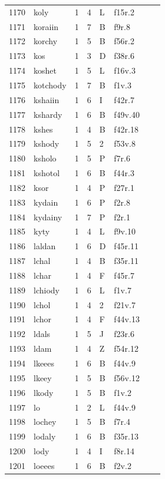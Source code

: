 \documentclass[11pt,a4paper]{article}
\begin{document}
\begin{landscape}
\begin{longtable}{@{}r>{\ttfamily}lrrl>{\ttfamily}l>{\raggedright\arraybackslash}p{80mm}>{\raggedright\arraybackslash}p{36mm}@{}}
1170 & koly & 1 & 4 & L & f15r.2 &  & \\
1171 & koraiin & 1 & 7 & B & f9r.8 &  & \\
1172 & korchy & 1 & 5 & B & f56r.2 &  & \\
1173 & kos & 1 & 3 & D & f38r.6 &  & \\
1174 & koshet & 1 & 5 & L & f16v.3 &  & \\
1175 & kotchody & 1 & 7 & B & f1v.3 &  & \\
1176 & kshaiin & 1 & 6 & I & f42r.7 &  & \\
1177 & kshardy & 1 & 6 & B & f49v.40 &  & \\
1178 & kshes & 1 & 4 & B & f42r.18 &  & \\
1179 & kshody & 1 & 5 & 2 & f53v.8 &  & \\
1180 & ksholo & 1 & 5 & P & f7r.6 &  & \\
1181 & kshotol & 1 & 6 & B & f44r.3 &  & \\
1182 & ksor & 1 & 4 & P & f27r.1 &  & \\
1183 & kydain & 1 & 6 & P & f2r.8 &  & \\
1184 & kydainy & 1 & 7 & P & f2r.1 &  & \\
1185 & kyty & 1 & 4 & L & f9v.10 &  & \\
1186 & laldan & 1 & 6 & D & f45r.11 &  & \\
1187 & lchal & 1 & 4 & B & f35r.11 &  & \\
1188 & lchar & 1 & 4 & F & f45r.7 &  & \\
1189 & lchiody & 1 & 6 & L & f1v.7 &  & \\
1190 & lchol & 1 & 4 & 2 & f21v.7 &  & \\
1191 & lchor & 1 & 4 & F & f44v.13 &  & \\
1192 & ldals & 1 & 5 & J & f23r.6 &  & \\
1193 & ldam & 1 & 4 & Z & f54r.12 &  & \\
1194 & lkeees & 1 & 6 & B & f44v.9 &  & \\
1195 & lkeey & 1 & 5 & B & f56v.12 &  & \\
1196 & lkody & 1 & 5 & B & f1v.2 &  & \\
1197 & lo & 1 & 2 & L & f44v.9 &  & \\
1198 & lochey & 1 & 5 & B & f7r.4 &  & \\
1199 & lodaly & 1 & 6 & B & f35r.13 &  & \\
1200 & lody & 1 & 4 & I & f8r.14 &  & \\
1201 & loeees & 1 & 6 & B & f2v.2 &  & \\

\end{longtable}
\end{landscape}
\end{document}
